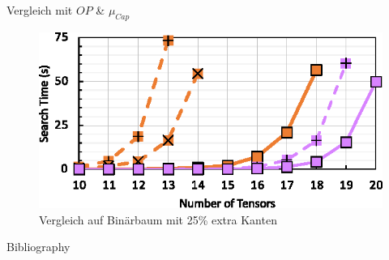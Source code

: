 \documentclass{beamer}
\begin{document}
\begin{frame}{Vergleich mit $OP$ \& $\mu_{Cap}$}
	\begin{figure}
		\includegraphics[scale=1.3]{figure_14_b}
		\caption*{Vergleich auf Binärbaum mit 25\% extra Kanten}
	\end{figure}
\end{frame}

\begin{frame}[allowframebreaks]{Bibliography}
	
	
\end{frame}
\end{document}
